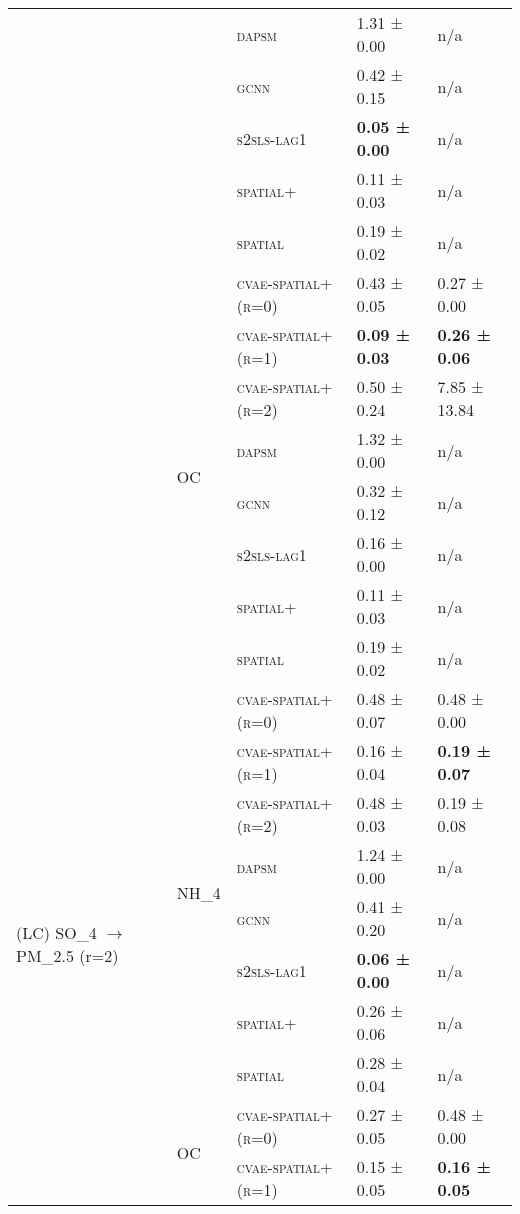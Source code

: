 \documentclass{article}
\begin{document}
\begin{table}[!tbp]
\begin{tabular}{lllll}
 &  & \textsc{dapsm} & 1.31 ± {\small 0.00} & n/a \\
 &  & \textsc{gcnn} & 0.42 ± {\small 0.15} & n/a \\
 &  & \textsc{s2sls-lag1} & \bf 0.05 ± {\small 0.00} & n/a \\
 &  & \textsc{spatial+} & 0.11 ± {\small 0.03} & n/a \\
 &  & \textsc{spatial} & 0.19 ± {\small 0.02} & n/a \\
\cline{2-5}
 & \multirow[t]{8}{*}{OC} & \textsc{cvae-spatial+ (r=0)} & 0.43 ± {\small 0.05} & 0.27 ± {\small 0.00} \\
 &  & \textsc{cvae-spatial+ (r=1)} & \bf 0.09 ± {\small 0.03} & \bf 0.26 ± {\small 0.06} \\
 &  & \textsc{cvae-spatial+ (r=2)} & 0.50 ± {\small 0.24} & 7.85 ± {\small 13.84} \\
 &  & \textsc{dapsm} & 1.32 ± {\small 0.00} & n/a \\
 &  & \textsc{gcnn} & 0.32 ± {\small 0.12} & n/a \\
 &  & \textsc{s2sls-lag1} & 0.16 ± {\small 0.00} & n/a \\
 &  & \textsc{spatial+} & 0.11 ± {\small 0.03} & n/a \\
 &  & \textsc{spatial} & 0.19 ± {\small 0.02} & n/a \\
\cline{1-5} \cline{2-5}
\multirow[t]{16}{*}{(LC) SO_{4} $\to$ PM_{2.5} (r=2)} & \multirow[t]{8}{*}{NH_4} & \textsc{cvae-spatial+ (r=0)} & 0.48 ± {\small 0.07} & 0.48 ± {\small 0.00} \\
 &  & \textsc{cvae-spatial+ (r=1)} & 0.16 ± {\small 0.04} & \bf 0.19 ± {\small 0.07} \\
 &  & \textsc{cvae-spatial+ (r=2)} & 0.48 ± {\small 0.03} & 0.19 ± {\small 0.08} \\
 &  & \textsc{dapsm} & 1.24 ± {\small 0.00} & n/a \\
 &  & \textsc{gcnn} & 0.41 ± {\small 0.20} & n/a \\
 &  & \textsc{s2sls-lag1} & \bf 0.06 ± {\small 0.00} & n/a \\
 &  & \textsc{spatial+} & 0.26 ± {\small 0.06} & n/a \\
 &  & \textsc{spatial} & 0.28 ± {\small 0.04} & n/a \\
\cline{2-5}
 & \multirow[t]{8}{*}{OC} & \textsc{cvae-spatial+ (r=0)} & 0.27 ± {\small 0.05} & 0.48 ± {\small 0.00} \\
 &  & \textsc{cvae-spatial+ (r=1)} & 0.15 ± {\small 0.05} & \bf 0.16 ± {\small 0.05} \\

\end{tabular}
\end{table}
\end{document}
